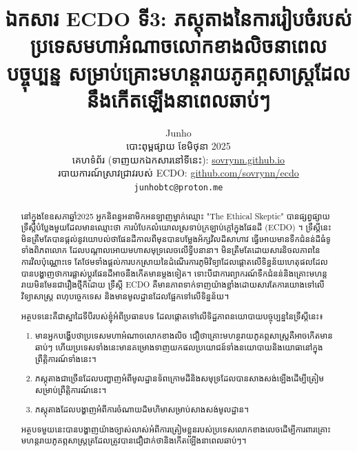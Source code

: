 \documentclass[10pt,twocolumn,letterpaper]{article}
\begin{document}
\title{ឯកសារ ECDO ទី3: ភស្តុតាងនៃការរៀបចំរបស់ប្រទេសមហាអំណាចលោកខាងលិចនាពេលបច្ចុប្បន្ន សម្រាប់គ្រោះមហន្តរាយភូគព្ភសាស្ត្រដែលនឹងកើតឡើងនាពេលឆាប់ៗ}

\author{Junho\\
	បោះពុម្ពផ្សាយ ខែមិថុនា 2025\\
	គេហទំព័រ (ទាញយកឯកសារនៅទីនេះ): \href{https://sovrynn.github.io}{sovrynn.github.io}\\
	របាយការណ៍ស្រាវជ្រាវរបស់ ECDO: \href{https://github.com/sovrynn/ecdo}{github.com/sovrynn/ecdo}\\
{\tt\small junhobtc@proton.me}
}
\maketitle

\begin{abstract}
	នៅក្នុងខែឧសភាឆ្នាំ2025 អ្នកនិពន្ធអនាមិកអនឡាញម្នាក់ឈ្មោះ "The Ethical Skeptic" \cite{0} បានផ្សព្វផ្សាយទ្រឹស្ដីបំប្លែងមួយដែលមានឈ្មោះថា ការបំបែកលំយោលស្រទាប់ក្រឡាប់ក្តៅក្នុងផែនដី (ECDO) \cite{1}។ ទ្រឹស្ដីនេះមិនត្រឹមតែបានផ្តល់នូវយោបល់ថាផែនដីកាលពីមុនបានបម្លែងអ័ក្សវិលដ៏សាហាវ ធ្វើអោយមានទឹកជំនន់ដ៏ធំទូទាំងពិភពលោក ដែលបណ្តាលអោយមហាសមុទ្រលេចលើទ្វីបនានា។ មិនត្រឹមតែដោយសារនិចលភាពនៃការវិលប៉ុណ្ណោះទេ តែថែមទាំងផ្ដល់ការបកស្រាយនៃដំណើរការភូមិវិទ្យាដែលផ្តោតលើទិន្នន័យហេតុផលដែលបានបង្ហាញថាការផ្លាស់ប្តូរផែនដីអាចនឹងកើតមានម្តងទៀត។ ទោះបីជាការព្យាករណ៍ទឹកជំនន់និងគ្រោះមហន្តរាយមិនមែនជារឿងថ្មីក៏ដោយ ទ្រឹស្ដី ECDO គឺមានភាពទាក់ទាញយ៉ាងខ្លាំងដោយសារតែការយោងទៅលើវិទ្យាសាស្ត្រ ពហុបច្ចេកទេស និងមានមូលដ្ឋានដែលផ្អែកទៅលើទិន្នន័យ។

	អត្ថបទនេះគឺជាស្នាដៃទីបីរបស់ខ្ញុំអំពីប្រធានបទ\cite{2,3}  ដែលផ្តោតទៅលើទិដ្ឋភាពនយោបាយបច្ចុប្បន្ននៃទ្រឹស្តីនេះ៖
\begin{flushleft}
\begin{enumerate}
    \item មានអ្នកបង្ហើបថាប្រទេសមហាអំណាចលោកខាងលិច ជឿថាគ្រោះមហន្ថរាយភូគព្ភសាស្ត្រគឺអាចកើតមានឆាប់ៗ ហើយប្រទេសទាំងនេះមានគម្រោងទាញយកផលប្រយោជន៍ទាំងនយោបាយនិងយោធានៅក្នុងព្រឹត្តិការណ៍ទាំងនេះ។
    \item ភស្តុតាងជាច្រើនដែលបញ្ហាញអំពីមូលដ្ឋានទ័ពក្រោមដីនិងសមុទ្រដែលបានសាងសង់ឡើងដើម្បីត្រៀមសម្រាប់ព្រឹត្តិការណ៍នេះ។
    \item ភស្តុតាងដែលបង្ហាញអំពីការចំណាយដ៏មហិមាសម្រាប់សាងសង់មូលដ្ឋាន។
\end{enumerate}
\end{flushleft}
	អត្ថបទមួយនេះបានបង្ហាញយ៉ាងច្បាស់លាស់អំពីការត្រៀមខ្លួនរបស់ប្រទេសលោកខាងលេចដើម្បីការពារគ្រោះមហន្តរាយភូគព្ភសាស្ត្រត្រដែលត្រូវបានជឿជាក់ថានិងកើតឡើងនាពេលឆាប់ៗ។
\end{abstract}
\end{document}
